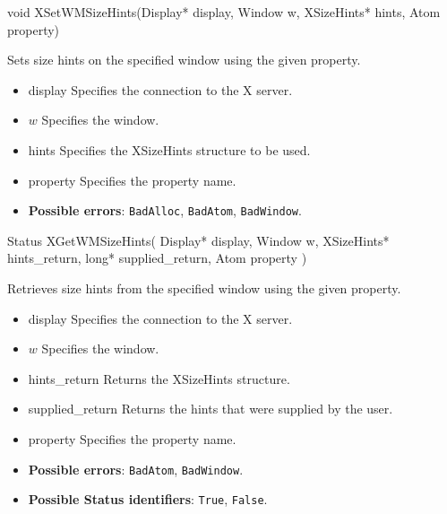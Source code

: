 \documentclass{report}
\begin{document}
\begin{itemize}
            \begin{cppcode}
            void XSetWMSizeHints(Display* display, Window w, XSizeHints* hints, Atom property)
            \end{cppcode}
            \bigbreak \noindent
            Sets size hints on the specified window using the given property.

            \begin{itemize}
                \item display Specifies the connection to the X server.
                \item $w$ Specifies the window.
                \item hints Specifies the XSizeHints structure to be used.
                \item property Specifies the property name.
            \end{itemize}

            \begin{itemize}
                \item \textbf{Possible errors}: \texttt{BadAlloc}, \texttt{BadAtom}, \texttt{BadWindow}.
            \end{itemize}

            \begin{cppcode}
            Status XGetWMSizeHints(
                Display* display,
                Window w,
                XSizeHints* hints_return,
                long* supplied_return,
                Atom property
            )
            \end{cppcode}
            \bigbreak \noindent
            Retrieves size hints from the specified window using the given property.
            \begin{itemize}
                \item display Specifies the connection to the X server.
                \item $w$ Specifies the window.
                \item hints\_return Returns the XSizeHints structure.
                \item supplied\_return Returns the hints that were supplied by the user.
                \item property Specifies the property name.
            \end{itemize}
            \begin{itemize}
                \item \textbf{Possible errors}: \texttt{BadAtom}, \texttt{BadWindow}.
                \item \textbf{Possible Status identifiers}: \texttt{True}, \texttt{False}.
            \end{itemize}


\end{itemize}
\end{document}
